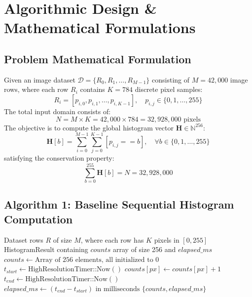 \documentclass[12pt,a4paper,oneside]{report}
\begin{document}
\chapter{Algorithmic Design \& Mathematical Formulations}

\section{Problem Mathematical Formulation}
Given an image dataset $\mathcal{D} = \{R_0, R_1, \dots, R_{M-1}\}$ consisting of $M = 42,000$ image rows, where each row $R_i$ contains $K = 784$ discrete pixel samples:
\begin{equation}
    R_i = [p_{i,0}, p_{i,1}, \dots, p_{i,K-1}], \quad p_{i,j} \in \{0, 1, \dots, 255\}
\end{equation}
The total input domain consists of:
\begin{equation}
    N = M \times K = 42,000 \times 784 = 32,928,000 \text{ pixels}
\end{equation}
The objective is to compute the global histogram vector $\mathbf{H} \in \mathbb{N}^{256}$:
\begin{equation}
    \mathbf{H}[b] = \sum_{i=0}^{M-1} \sum_{j=0}^{K-1} [p_{i,j} == b], \quad \forall b \in \{0, 1, \dots, 255\}
\end{equation}
satisfying the conservation property:
\begin{equation}
    \sum_{b=0}^{255} \mathbf{H}[b] = N = 32,928,000
\end{equation}

\section{Algorithm 1: Baseline Sequential Histogram Computation}

\begin{algorithm}[h!]
\caption{Sequential Pixel Histogram Generation}
\label{alg:sequential}
\begin{algorithmic}[1]
\Require Dataset rows $R$ of size $M$, where each row has $K$ pixels in $[0, 255]$
\Ensure HistogramResult containing $counts$ array of size 256 and $elapsed\_ms$
\State $counts \gets \text{Array of 256 elements, all initialized to } 0$
\State $t_{start} \gets \text{HighResolutionTimer::Now}()$
        \State $counts[px] \gets counts[px] + 1$
    \EndFor
\EndFor
\State $t_{end} \gets \text{HighResolutionTimer::Now}()$
\State $elapsed\_ms \gets (t_{end} - t_{start}) \text{ in milliseconds}$
\State \Return $\{ counts, elapsed\_ms \}$
\end{algorithmic}
\end{algorithm}
\end{document}
